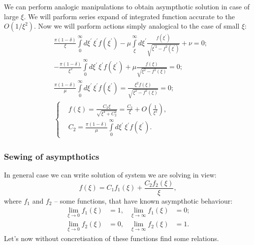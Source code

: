 \documentclass[10pt]{article}
\begin{document}
We can perform analogic manipulations to obtain asympthotic solution in case of large $\xi$.
We will parform series expand of integrated function accurate to the $O(1/\xi^2)$.
Now we will parform actions simply analogical to the case of small $\xi$:
\begin{eqnarray}
  &\frac{\pi (1-\delta)}{\xi} \int\limits_0^\infty d \xi^{\prime} \, \xi^{\prime} f(\xi^{\prime}) - \mu \int\limits_\xi^\infty d \xi^{\prime} \frac{f(\xi^{\prime})}{\sqrt{\xi^{\prime 2} - f^2 (\xi^{\prime})}} + \nu = 0;\\
  &-\frac{\pi (1-\delta)}{\xi^2} \int\limits_0^\infty d \xi^{\prime} \, \xi^{\prime} f(\xi^{\prime}) + \mu \frac{f(\xi)}{\sqrt{\xi^{2} - f^2 (\xi)}} = 0;\\
  &\frac{\pi (1-\delta)}{\mu} \int\limits_0^\infty d \xi^{\prime} \, \xi^{\prime} f(\xi^{\prime}) =   \frac{\xi^2 f(\xi)}{\sqrt{\xi^{2} - f^2 (\xi)}} = 0;\\
  &\left\{
    \begin{aligned}
      &f(\xi) = \frac{C_2 \xi}{\sqrt{\xi^4 + C_2^2}} = \frac{C_2}{\xi} + O(\frac{1}{\xi^2}),\\
      &C_2 = \frac{\pi (1-\delta)}{\mu} \int\limits_0^\infty d \xi^{\prime} \, \xi^{\prime} f(\xi^{\prime}). 
    \end{aligned}
  \right. \label{asmpt_inf}
\end{eqnarray}



\subsubsection{Sewing of asympthotics}

In general case we can write solution of system we are solving in view:
\begin{equation}
  f(\xi) = C_1 f_1 (\xi) + \frac{C_2 f_2 (\xi)}{\xi},
  \label{eqn_sewing}
\end{equation}
where $f_1$ and $f_2$ -- some functions, that have known asympthotic behaviour:
\begin{align}
  \lim_{\xi \rightarrow 0} f_1 (\xi) &= 1, & \lim_{\xi \rightarrow \infty} f_1 (\xi) &= 0; \nonumber\\
  \lim_{\xi \rightarrow 0} f_2 (\xi) &= 0, & \lim_{\xi \rightarrow \infty} f_2 (\xi) &= 1. \nonumber
\end{align}
Let's now without concretisation of these functions find some relations.
\end{document}
